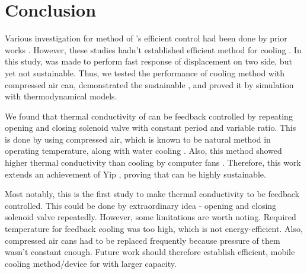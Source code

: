 \section{Conclusion}
Various investigation for method of \scpnospace's efficient control had been done by prior works \cite{haines,mirvakili,yip}. %
However, these studies hadn't established efficient method for cooling \scpnospace. %
In this study, \anta was made to perform fast response of displacement on two side, but yet not sustainable. Thus, we tested the performance of cooling method with compressed air can, demonstrated the sustainable \apcnospace, and proved it by simulation with thermodynamical models. %

We found that thermal conductivity of \scp can be feedback controlled by repeating opening and closing solenoid valve with constant period and variable ratio. %
This is done by using compressed air, which is known to be natural method in operating temperature, along with water cooling \cite{madden}.
Also, this method showed higher thermal conductivity than cooling by computer fans \cite{yip}.
Therefore, this work extends an achievement of Yip \etal, proving that \apc can be highly sustainable.

Most notably, this is the first study to make thermal conductivity to be feedback controlled. This could be done by extraordinary idea - opening and closing solenoid valve repeatedly.
However, some limitations are worth noting. Required temperature for feedback cooling was too high, which is not energy-efficient.
Also, compressed air cans had to be replaced frequently because pressure of them wasn't constant enough. 
Future work should therefore establish efficient, mobile cooling method/device for \scp with larger capacity.



